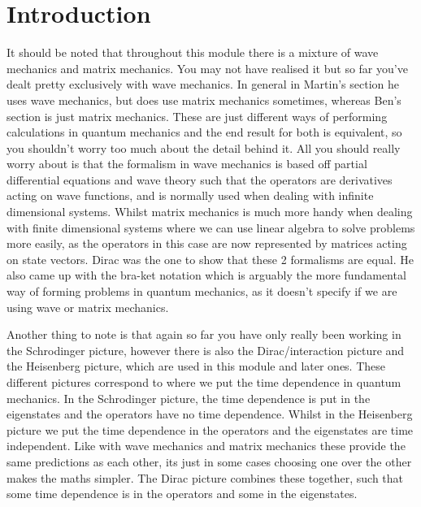 \documentclass[
11pt, %
oneside, %
english, %
onehalfspacing, %
]{McMasterThesis} %
\begin{document}
\section*{\Huge Introduction} 
It should be noted that throughout this module there is a mixture of wave mechanics and matrix mechanics. You may not have realised it but so far you've dealt pretty exclusively with wave mechanics. In general in Martin's section he uses wave mechanics, but does use matrix mechanics sometimes, whereas Ben's section is just matrix mechanics. These are just different ways of performing calculations in quantum mechanics and the end result for both is equivalent, so you shouldn't worry too much about the detail behind it. All you should really worry about is that the formalism in wave mechanics is based off partial differential equations and wave theory such that the operators are derivatives acting on wave functions, and is normally used when dealing with infinite dimensional systems. Whilst matrix mechanics is much more handy when dealing with finite dimensional systems where we can use linear algebra to solve problems more easily, as the operators in this case are now represented by matrices acting on state vectors. Dirac was the one to show that these 2 formalisms are equal. He also came up with the bra-ket notation which is arguably the more fundamental way of forming problems in quantum mechanics, as it doesn't specify if we are using wave or matrix mechanics.

\noindent Another thing to note is that again so far you have only really been working in the Schrodinger picture, however there is also the Dirac/interaction picture and the Heisenberg picture, which are used in this module and later ones. These different pictures correspond to where we put the time dependence in quantum mechanics. In the Schrodinger picture, the time dependence is put in the eigenstates and the operators have no time dependence. Whilst in the Heisenberg picture we put the time dependence in the operators and the eigenstates are time independent. Like with wave mechanics and matrix mechanics these provide the same predictions as each other, its just in some cases choosing one over the other makes the maths simpler. The Dirac picture combines these together, such that some time dependence is in the operators and some in the eigenstates. 
\end{document}
